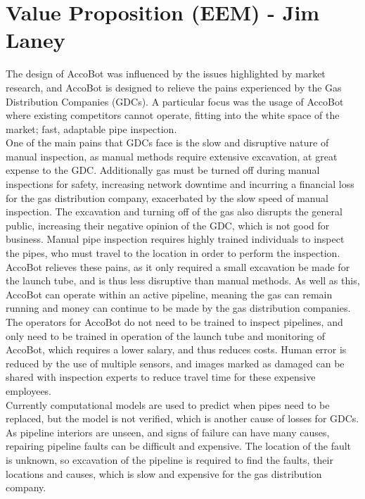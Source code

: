 \documentclass[11pt]{article}		%
\begin{document}
	\section[Value Proposition - EEM]{Value Proposition (EEM) - Jim Laney} \label{solutionEvaluation}
	
		The design of AccoBot was influenced by the issues highlighted by market research, and AccoBot is designed to relieve the pains experienced by the Gas Distribution Companies (GDCs).
		A particular focus was the usage of AccoBot where existing competitors cannot operate, fitting into the white space of the market; fast, adaptable pipe inspection.
		\\
        \hspace*{2ex}One of the main pains that GDCs face is the slow and disruptive nature of manual inspection, as manual methods require extensive excavation, at great expense to the GDC.
		Additionally gas must be turned off during manual inspections for safety, increasing network downtime and incurring a financial loss for the gas distribution company, exacerbated by the slow speed of manual inspection.
		The excavation and turning off of the gas also disrupts the general public, increasing their negative opinion of the GDC, which is not good for business.
		Manual pipe inspection requires highly trained individuals to inspect the pipes, who must travel to the location in order to perform the inspection.
		AccoBot relieves these pains, as it only required a small excavation be made for the launch tube, and is thus less disruptive than manual methods.
		As well as this, AccoBot can operate within an active pipeline, meaning the gas can remain running and money can continue to be made by the gas distribution companies.
		The operators for AccoBot do not need to be trained to inspect pipelines, and only need to be trained in operation of the launch tube and monitoring of AccoBot, which requires a lower salary, and thus reduces costs.
		Human error is reduced by the use of multiple sensors, and images marked as damaged can be shared with inspection experts to reduce travel time for these expensive employees.
		\\
        \hspace*{2ex}Currently computational models are used to predict when pipes need to be replaced, but the model is not verified, which is another cause of losses for GDCs.
		As pipeline interiors are unseen, and signs of failure can have many causes, repairing pipeline faults can be difficult and expensive.
		The location of the fault is unknown, so excavation of the pipeline is required to find the faults, their locations and causes, which is slow and expensive for the gas distribution company.
\end{document}
